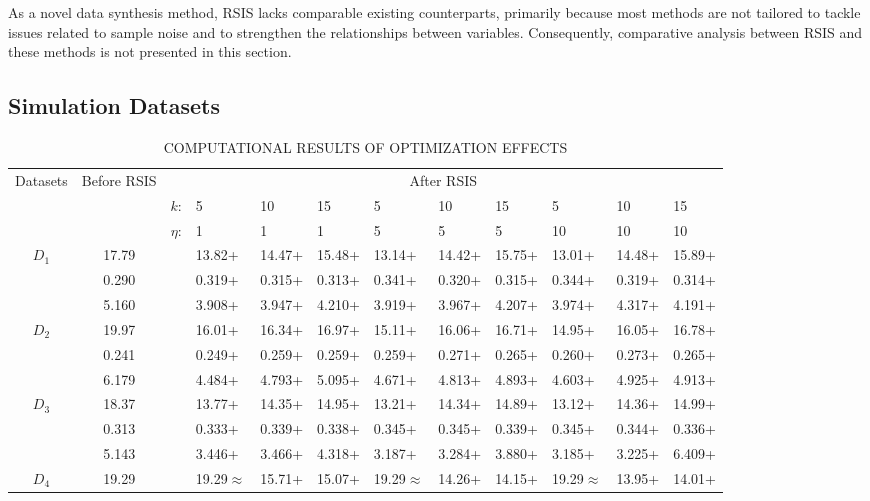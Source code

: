 \documentclass[lettersize,journal]{IEEEtran}
\begin{document}
As a novel data synthesis method, RSIS lacks comparable existing 
counterparts, primarily because most methods are not tailored to 
tackle issues related to sample noise and to strengthen the 
relationships between variables. Consequently, comparative analysis between RSIS and 
these methods is not presented in this section.

\subsection{Simulation Datasets}

\begin{table}[]
  \caption{COMPUTATIONAL RESULTS OF OPTIMIZATION EFFECTS}\label{tab3}
  \begin{tabularx}{\textwidth}{cccXXXXXXXXX}
  \toprule
  \multirow{3}{*}{Datasets} & \multirow{3}{*}{Before RSIS} & \multicolumn{10}{c}{After RSIS} \\ 
  \cmidrule{3-12}
    &  & $k$: & 5 & 10 & 15 & 5 & 10 & 15 & 5 & 10 & 15 \\ 
    &  & $\eta$: & 1 & 1 & 1 & 5 & 5 & 5 & 10 & 10 & 10 \\
  \hline
  \multirow{3}{*}{$D_1$} & 17.79 &  & 13.82+ & 14.47+ & 15.48+ & 13.14+ & 14.42+ & 15.75+ & 13.01+ & 14.48+ & 15.89+ \\
    & 0.290 &  & 0.319+ & 0.315+ & 0.313+ & 0.341+ & 0.320+ & 0.315+ & 0.344+ & 0.319+ & 0.314+ \\
    & 5.160 &  & 3.908+ & 3.947+ & 4.210+ & 3.919+ & 3.967+ & 4.207+ & 3.974+ & 4.317+ & 4.191+ \\
  \hline
  \multirow{3}{*}{$D_2$} & 19.97 &  & 16.01+ & 16.34+ & 16.97+ & 15.11+ & 16.06+ & 16.71+ & 14.95+ & 16.05+ & 16.78+ \\
    & 0.241 &  & 0.249+ & 0.259+ & 0.259+ & 0.259+ & 0.271+ & 0.265+ & 0.260+ & 0.273+ & 0.265+ \\
    & 6.179 &  & 4.484+ & 4.793+ & 5.095+ & 4.671+ & 4.813+ & 4.893+ & 4.603+ & 4.925+ & 4.913+ \\
  \hline
  \multirow{3}{*}{$D_3$} & 18.37 &  & 13.77+ & 14.35+ & 14.95+ & 13.21+ & 14.34+ & 14.89+ & 13.12+ & 14.36+ & 14.99+ \\
    & 0.313 &  & 0.333+ & 0.339+ & 0.338+ & 0.345+ & 0.345+ & 0.339+ & 0.345+ & 0.344+ & 0.336+ \\
    & 5.143 &  & 3.446+ & 3.466+ & 4.318+ & 3.187+ & 3.284+ & 3.880+ & 3.185+ & 3.225+ & 6.409+ \\
  \hline
  \multirow{3}{*}{$D_4$} & 19.29 &  & 19.29$\approx$ & 15.71+ & 15.07+ & 19.29$\approx$ & 14.26+ & 14.15+ & 19.29$\approx$ & 13.95+ & 14.01+ \\

\end{tabularx}
\end{table}
\end{document}
